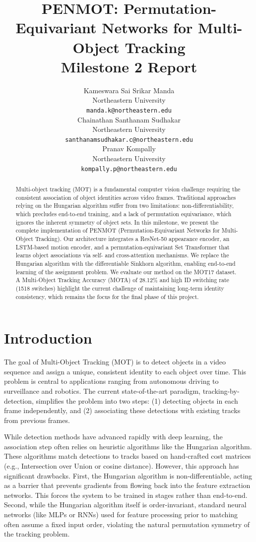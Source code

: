 \documentclass{article}
\title{PENMOT: Permutation-Equivariant Networks for Multi-Object Tracking \\ \large Milestone 2 Report}
\author{%
  Kameswara Sai Srikar Manda \\
  Northeastern University\\
  \texttt{manda.k@northeastern.edu} \\
  \And
  Chainathan Santhanam Sudhakar \\
  Northeastern University\\
  \texttt{santhanamsudhakar.c@northeastern.edu} \\
  \And
  Pranav Kompally \\
  Northeastern University\\
  \texttt{kompally.p@northeastern.edu} \\
}
\begin{document}
\maketitle

\begin{abstract}
  Multi-object tracking (MOT) is a fundamental computer vision challenge requiring the consistent association of object identities across video frames. Traditional approaches relying on the Hungarian algorithm suffer from two limitations: non-differentiability, which precludes end-to-end training, and a lack of permutation equivariance, which ignores the inherent symmetry of object sets. In this milestone, we present the complete implementation of PENMOT (Permutation-Equivariant Networks for Multi-Object Tracking). Our architecture integrates a ResNet-50 appearance encoder, an LSTM-based motion encoder, and a permutation-equivariant Set Transformer that learns object associations via self- and cross-attention mechanisms. We replace the Hungarian algorithm with the differentiable Sinkhorn algorithm, enabling end-to-end learning of the assignment problem. We evaluate our method on the MOT17 dataset. A Multi-Object Tracking Accuracy (MOTA) of 28.12\% and high ID switching rate (1518 switches) highlight the current challenge of maintaining long-term identity consistency, which remains the focus for the final phase of this project.
\end{abstract}

\section{Introduction}

The goal of Multi-Object Tracking (MOT) is to detect objects in a video sequence and assign a unique, consistent identity to each object over time. This problem is central to applications ranging from autonomous driving to surveillance and robotics. The current state-of-the-art paradigm, tracking-by-detection, simplifies the problem into two steps: (1) detecting objects in each frame independently, and (2) associating these detections with existing tracks from previous frames.

While detection methods have advanced rapidly with deep learning, the association step often relies on heuristic algorithms like the Hungarian algorithm. These algorithms match detections to tracks based on hand-crafted cost matrices (e.g., Intersection over Union or cosine distance). However, this approach has significant drawbacks. First, the Hungarian algorithm is non-differentiable, acting as a barrier that prevents gradients from flowing back into the feature extraction networks. This forces the system to be trained in stages rather than end-to-end. Second, while the Hungarian algorithm itself is order-invariant, standard neural networks (like MLPs or RNNs) used for feature processing prior to matching often assume a fixed input order, violating the natural permutation symmetry of the tracking problem.
\end{document}
